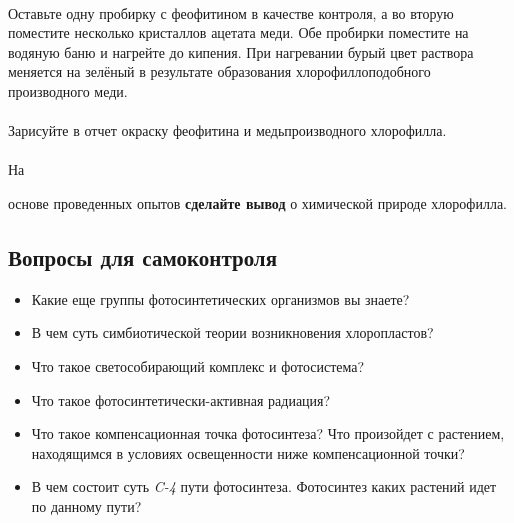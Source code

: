 \paragraph*{}Оставьте одну пробирку с феофитином в качестве контроля, а во вторую поместите несколько кристаллов ацетата меди. Обе пробирки поместите на водяную баню и нагрейте до кипения. При нагревании бурый цвет раствора меняется на зелёный в результате образования хлорофиллоподобного производного меди.

\paragraph*{}Зарисуйте в отчет окраску феофитина и медьпроизводного хлорофилла.

\paragraph*{}\hypertarget{hlorpophilus_etherus}{На} основе проведенных опытов \textbf{сделайте вывод} о химической природе хлорофилла.

\subsection*{Вопросы для самоконтроля}

\begin{itemize}
 \item Какие еще группы фотосинтетических организмов вы знаете?
 \item В чем суть симбиотической теории возникновения хлоропластов?
 \item Что такое светособирающий комплекс и фотосистема?
 \item Что такое фотосинтетически-активная радиация?
 \item Что такое компенсационная точка фотосинтеза? Что произойдет с растением, находящимся в условиях освещенности ниже компенсационной точки?
 \item В чем состоит суть \textit{C-4} пути фотосинтеза. Фотосинтез каких растений идет по данному пути?
\end{itemize}



